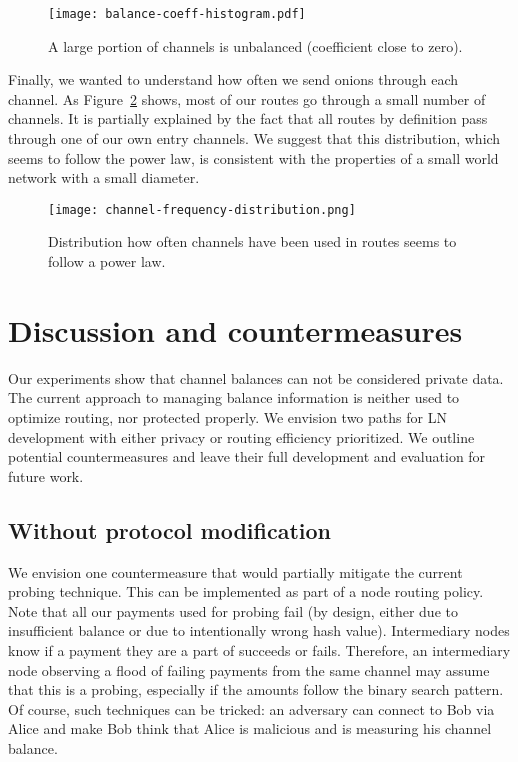 \begin{figure}[]
	\centering
	\texttt{[image: balance-coeff-histogram.pdf]}
	\caption{A large portion of channels is unbalanced (coefficient close to zero).}
	\label{fig:balance-coeff-histogram}
\end{figure}

Finally, we wanted to understand how often we send onions through each channel.
As Figure~\ref{fig:channel-frequency-distribution} shows, most of our routes go through a small number of channels.
It is partially explained by the fact that all routes by definition pass through one of our own entry channels.
We suggest that this distribution, which seems to follow the power law, is consistent with the properties of a small world network with a small diameter.

\begin{figure}[]
	\centering
	\texttt{[image: channel-frequency-distribution.png]}
	\caption{Distribution how often channels have been used in routes seems to follow a power law.}
	\label{fig:channel-frequency-distribution}
\end{figure}





\section{Discussion and countermeasures} \label{sec:discussion}
Our experiments show that channel balances can not be considered private data.
The current approach to managing balance information is neither used to optimize routing, nor protected properly.
We envision two paths for LN development with either privacy or routing efficiency prioritized.
We outline potential countermeasures and leave their full development and evaluation for future work.

\subsection{Without protocol modification}
We envision one countermeasure that would partially mitigate the current probing technique.
This can be implemented as part of a node routing policy.
Note that all our payments used for probing fail (by design, either due to insufficient balance or due to intentionally wrong hash value). 
Intermediary nodes know if a payment they are a part of succeeds or fails.
Therefore, an intermediary node observing a flood of failing payments from the same channel may assume that this is a probing, especially if the amounts follow the binary search pattern.
Of course, such techniques can be tricked: an adversary can connect to Bob via Alice and make Bob think that Alice is malicious and is measuring his channel balance.


